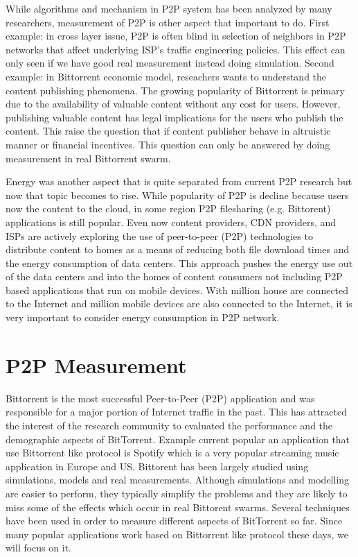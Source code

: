 While algorithms and mechanism in P2P system has been analyzed by many researchers, measurement of P2P is other aspect that important to do. 
First example: in cross layer issue, P2P is often blind in selection of neighbors in P2P networks that affect underlying ISP's traffic engineering policies.  
This effect can only seen if we have good real measurement instead doing simulation.
Second example: in Bittorrent economic model, reseachers wants to understand the content publishing phenomena. 
The growing popularity of Bittorrent is primary due to the availability of valuable content without any cost for users.
However, publishing valuable content has legal implications for the users who publish the content.
This raise the question that if content publisher behave in altruistic manner or financial incentives. 
This question can only be answered by doing measurement in real Bittorrent swarm. 

Energy was another aspect that is quite separated from current P2P research but now that topic becomes to rise. 
While popularity of P2P is decline because users now the content to the cloud, in some region P2P filesharing (e.g. Bittorent) applications is still popular.
Even now content providers, CDN providers, and ISPs are actively exploring the use of peer-to-peer (P2P) technologies to distribute content to homes as a means of reducing both file download times and the energy consumption of data centers. 
This approach pushes the energy use out of the data centers and into the homes of content consumers not including P2P based applications that run on mobile devices.
With million house are connected to the Internet and million mobile devices are also connected to the Internet, it is very important to consider energy consumption in P2P network.


\section{P2P Measurement}

Bittorrent is the most successful Peer-to-Peer (P2P) application and was responsible for a major portion of Internet traffic in the past.
This has attracted the interest of the research community to evaluated the performance and the demographic aspects of BitTorrent.
Example current popular an application that use Bittorrent like protocol is Spotify which is a very popular streaming music application in Europe and US.
Bittorent has been largely studied using simulations, models and real measurements. 
Although simulations and modelling are easier to perform, they typically simplify the problems and they are likely to miss some of the effects which occur in real Bittorent swarms. 
Several techniques have been used in order to measure different aspects of BitTorrent so far. 
Since many popular applications work based on Bittorrent like protocol these days, we will focus on it.

